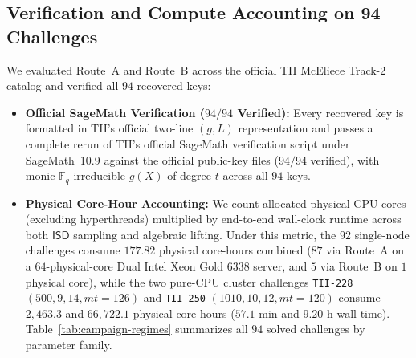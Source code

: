 \documentclass[11pt,a4paper]{article}
\theoremstyle{definition}
\theoremstyle{remark}
\newcommand{\F}{\mathbb{F}}
\newcommand{\ISD}{\mathsf{ISD}}
\begin{document}
\subsection{Verification and Compute Accounting on 94 Challenges}
We evaluated Route~A and Route~B across the official TII McEliece Track-2 catalog and verified all $94$ recovered keys:
\begin{itemize}[leftmargin=1.5em]
    \item \textbf{Official SageMath Verification ($94/94$ Verified):}
    Every recovered key is formatted in TII's official two-line $(g, L)$ representation and passes a complete rerun of TII's official SageMath verification script under SageMath~10.9 against the official public-key files ($94/94$ verified), with monic $\F_q$-irreducible $g(X)$ of degree $t$ across all $94$ keys.
    \item \textbf{Physical Core-Hour Accounting:}
    We count allocated physical CPU cores (excluding hyperthreads) multiplied by end-to-end wall-clock runtime across both $\ISD$ sampling and algebraic lifting. Under this metric, the $92$ single-node challenges consume $177.82$ physical core-hours combined ($87$ via Route~A on a $64$-physical-core Dual Intel Xeon Gold 6338 server, and $5$ via Route~B on $1$ physical core), while the two pure-CPU cluster challenges \texttt{TII-228} $(500, 9, 14, mt=126)$ and \texttt{TII-250} $(1010, 10, 12, mt=120)$ consume $2{,}463.3$ and $66{,}722.1$ physical core-hours ($57.1\text{ min}$ and $9.20\text{ h}$ wall time). Table~\ref{tab:campaign-regimes} summarizes all $94$ solved challenges by parameter family.
\end{itemize}
\end{document}
